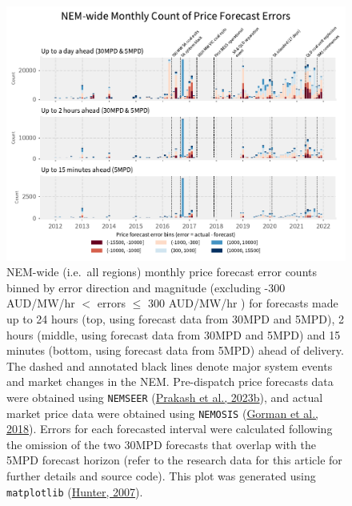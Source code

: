 \documentclass[12pt,a4paper,]{report}
\begin{document}
\begin{figure}
\hypertarget{fig:nem_historical_price_forecast_errors}{%
\centering
\includegraphics{source/figures/price_errors_nemwide_2012_2021.pdf}
\caption[Counts of NEM-wide price forecast errors, binned by direction
and magnitude, for each month from 2012 to 2021]{NEM-wide (i.e.~all
regions) monthly price forecast error counts binned by error direction
and magnitude (excluding -300 AUD/MW/hr \(<\) errors \(\leq\) 300
AUD/MW/hr ) for forecasts made up to 24 hours (top, using forecast data
from 30MPD and 5MPD), 2 hours (middle, using forecast data from 30MPD
and 5MPD) and 15 minutes (bottom, using forecast data from 5MPD) ahead
of delivery. The dashed and annotated black lines denote major system
events and market changes in the NEM. Pre-dispatch price forecasts data
were obtained using \texttt{NEMSEER}
(\protect\hyperlink{ref-prakashNEMSEERPythonPackage2023}{Prakash et al.,
2023b}), and actual market price data were obtained using
\texttt{NEMOSIS}
(\protect\hyperlink{ref-gormanNEMOSISNEMOpen2018}{Gorman et al., 2018}).
Errors for each forecasted interval were calculated following the
omission of the two 30MPD forecasts that overlap with the 5MPD forecast
horizon (refer to the research data for this article for further details
and source code). This plot was generated using \texttt{matplotlib}
(\protect\hyperlink{ref-hunterMatplotlib2DGraphics2007}{Hunter,
2007}).}\label{fig:nem_historical_price_forecast_errors}
}
\end{figure}
\end{document}
